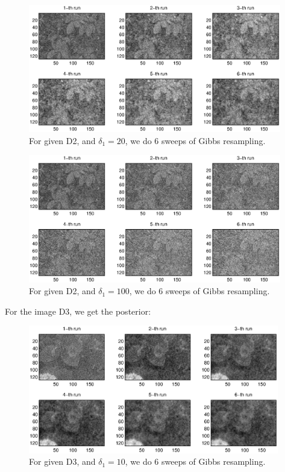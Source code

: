 \documentclass[11pt] {article}
\begin{document}
\begin{figure}
\begin{center}

\includegraphics[height=2.2in]{D2_d2.eps}

\end{center}
\caption{For given D2, and $\delta_1=20$, we do 6 sweeps of Gibbs resampling.}
\label{fig:D2_d2}
\end{figure}

\begin{figure}
\begin{center}

\includegraphics[height=2.2in]{D2_d3.eps}

\end{center}
\caption{For given D2, and $\delta_1=100$, we do 6 sweeps of Gibbs resampling.}
\label{fig:D2_d3}
\end{figure}


For the image D3, we get the posterior:


\begin{figure}
\begin{center}

\includegraphics[height=2.2in]{D3_d1.eps}

\end{center}
\caption{For given D3, and $\delta_1=10$, we do 6 sweeps of Gibbs resampling.}
\label{fig:D3_d1}
\end{figure}
\end{document}
